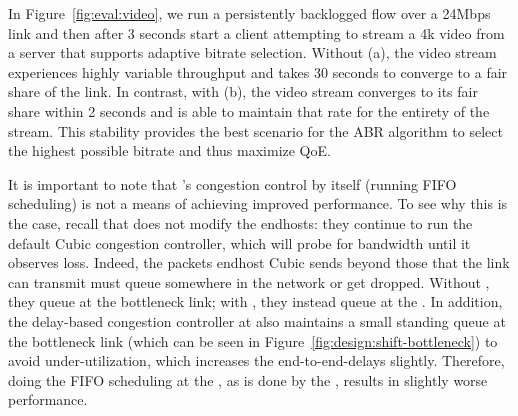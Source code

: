 {
\label{s:eval:ratestable}
In Figure~\ref{fig:eval:video}, we run a persistently backlogged flow over a 24Mbps link and then
after 3 seconds start a client attempting to stream a 4k video from a server that supports adaptive
bitrate selection. Without \name (a), the video stream experiences highly variable throughput and 
takes 30 seconds to converge to a fair share of the link. In contrast, with \name (b), the video
stream converges to its fair share within 2 seconds and is able to maintain that rate for the
entirety of the stream. This stability provides the best scenario for the ABR algorithm to select
the highest possible bitrate and thus maximize QoE.
}

 It is important to note that \name's congestion control by itself (\ie running FIFO scheduling) is not a means of achieving improved performance. 
To see why this is the case, recall that \name does not modify the endhosts: they continue to run the default Cubic congestion controller, which will probe for bandwidth until it observes loss.
Indeed, the packets endhost Cubic sends beyond those that the link can transmit must queue somewhere in the network or get dropped. 
Without \name, they queue at the bottleneck link;
with \name, they instead queue at the \inbox. 
In addition, the delay-based congestion controller at \inbox also maintains a small standing queue at the bottleneck link (which can be seen in Figure~\ref{fig:design:shift-bottleneck}) to avoid under-utilization, which increases the end-to-end-delays slightly. 
Therefore, doing the FIFO scheduling at the \name, as is done by the \baseline, results in slightly worse performance.

%




